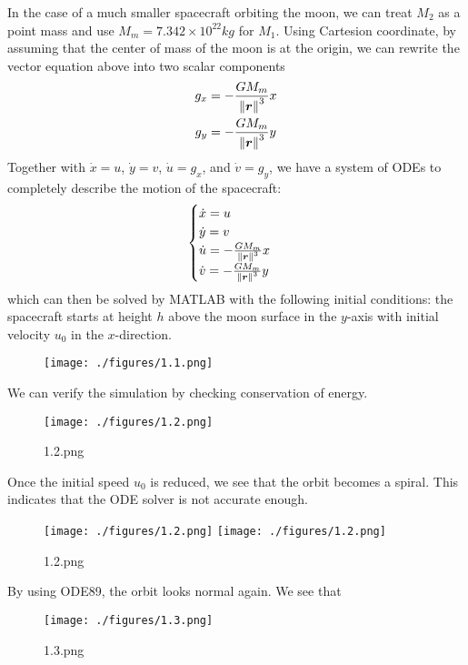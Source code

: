 \documentclass[12pt]{article}
\begin{document}
In the case of a much smaller spacecraft orbiting the moon, we can treat $ M_2$ as a point mass and use $ M_m = 7.342 \times 10^{22} kg$ for $ M_1$. Using Cartesion coordinate, by assuming that the center of mass of the moon is at the origin, we can rewrite the vector equation above into two scalar components
\begin{align*}
	g_x &= - \frac{G M_m}{ {\left\lVert{ {\bm{ r}} }\right\rVert} ^3} x \\
	g_y &= - \frac{G M_m}{ {\left\lVert{ {\bm{ r}} }\right\rVert} ^3} y 
\end{align*}
Together with $ \dot{x}=u$, $ \dot{y}=v$, $ \dot{u} = g_x$, and $ \dot{v}= g_y$, we have a system of ODEs to completely describe the motion of the spacecraft:
\begin{align*}
	\begin{cases}
		\dot{x}=u\\
		\dot{y}=v\\
		\dot{u} = - \frac{G M_m}{ {\left\lVert{ {\bm{ r}} }\right\rVert}^3 } x\\
		\dot{v} = - \frac{G M_m}{ {\left\lVert{ {\bm{ r}} }\right\rVert}^3 } y\\
	\end{cases}
\end{align*}
which can then be solved by MATLAB with the following initial conditions: the spacecraft starts at height $ h$ above the moon surface in the  $ y$-axis with initial velocity $ u_0$ in the $ x$-direction.
~\begin{figure}[H]
	\centering
	\texttt{[image: ./figures/1.1.png]}
	\caption{}
\end{figure}
We can verify the simulation by checking conservation of energy.
~\begin{figure}[H]
	\centering
	\texttt{[image: ./figures/1.2.png]}
	\caption{1.2.png}
\end{figure}
Once the initial speed $ u_0$ is reduced, we see that the orbit becomes a spiral. This indicates that the ODE solver is not accurate enough.
~\begin{figure}[H]
	\centering
	\texttt{[image: ./figures/1.2.png]}
	\texttt{[image: ./figures/1.2.png]}
	\caption{1.2.png}
\end{figure}
By using ODE89, the orbit looks normal again. We see that 
~\begin{figure}[H]
	\centering
	\texttt{[image: ./figures/1.3.png]}
	\caption{1.3.png}
\end{figure}
\end{document}
